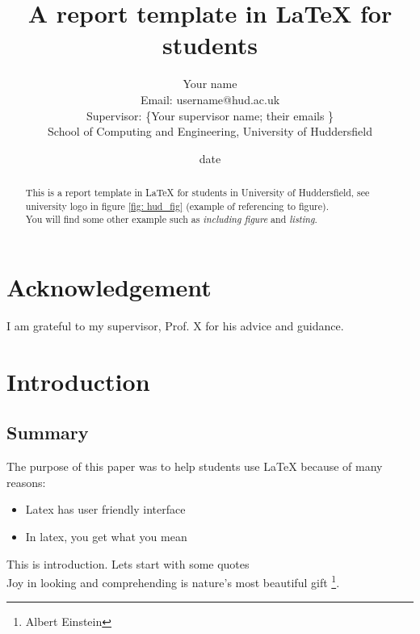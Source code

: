 \documentclass[11pt,a4paper]{report}
\begin{document}
\title{ A report template in \LaTeX{} for students }
\author{Your name \\ 
Email: username@hud.ac.uk \\
Supervisor:  \{Your supervisor name;  their emails \} \\
School of Computing and Engineering, University of Huddersfield \\
}
\date{ date } %
\maketitle

\begin{abstract}
This is a report template in \LaTeX{} for students in University of Huddersfield, see university logo in figure \ref{fig: hud_fig} (example of referencing to figure). \\
You will find some other example such as \textit{including figure} and \textit{listing}.

\end{abstract}

\chapter*{Acknowledgement}
I am grateful to my supervisor, Prof. X for his advice and guidance. \\

\tableofcontents %

\listoffigures	%

\chapter{Introduction}
\label{Introduction}
\newpage
\section{Summary}
The purpose of this paper was to help students use \LaTeX{} because of many reasons:
\begin{itemize}
\item Latex has user friendly interface
\item In latex, you get what you mean
\end{itemize}
This is introduction. Lets start with some quotes \\
Joy in looking and comprehending is nature's most beautiful gift \footnote{Albert Einstein}.
\end{document}
